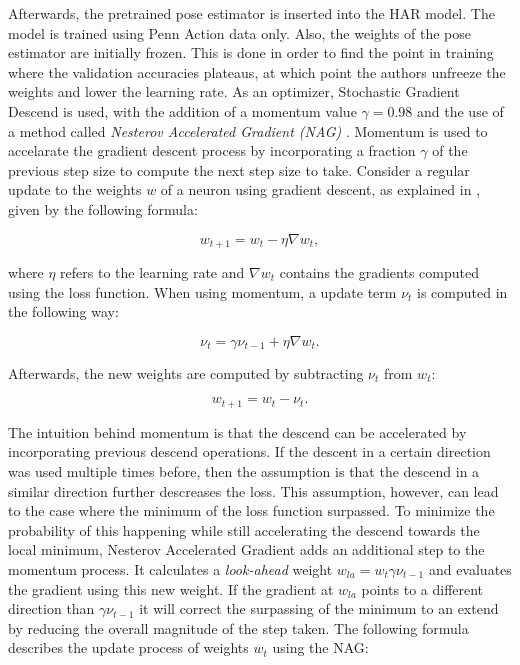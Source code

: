 Afterwards, the pretrained pose estimator is inserted into the HAR model.
The model is trained using Penn Action data only.
Also, the weights of the pose estimator are initially frozen.
This is done in order to find the point in training where the validation accuracies plateaus, at which point the authors unfreeze the weights and lower the learning rate.
As an optimizer, Stochastic Gradient Descend is used, with the addition of a momentum value $\gamma = 0.98$ and the use of a method called \textit{Nesterov Accelerated Gradient (NAG)} \cite{nesterov_method_1983}.
Momentum is used to accelarate the gradient descent process by incorporating a fraction $\gamma$ of the previous step size to compute the next step size to take.
Consider a regular update to the weights $w$ of a neuron using gradient descent, as explained in , given by the following formula:

\begin{equation}
    w_{t+1} = w_t - \eta \nabla w_t,
\end{equation}

where $\eta$ refers to the learning rate and $\nabla w_t$ contains the gradients computed using the loss function.
When using momentum, a update term $\nu_t$ is computed in the following way:

\begin{equation}
    \nu_t = \gamma \nu_{t-1} + \eta \nabla w_t.
\end{equation}

Afterwards, the new weights are computed by subtracting $\nu_t$ from $w_t$:

\begin{equation}
    w_{t+1} = w_t - \nu_t.
\end{equation}

The intuition behind momentum is that the descend can be accelerated by incorporating previous descend operations.
If the descent in a certain direction was used multiple times before, then the assumption is that the descend in a similar direction further descreases the loss.
This assumption, however, can lead to the case where the minimum of the loss function surpassed.
To minimize the probability of this happening while still accelerating the descend towards the local minimum, Nesterov Accelerated Gradient adds an additional step to the momentum process.
It calculates a \textit{look-ahead} weight $w_{la} = w_{t} \gamma \nu_{t-1}$ and evaluates the gradient using this new weight.
If the gradient at $w_{la}$ points to a different direction than $\gamma \nu_{t-1}$ it will correct the surpassing of the minimum to an extend by reducing the overall magnitude of the step taken.
The following formula describes the update process of weights $w_t$ using the NAG:

